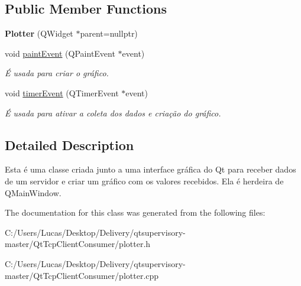 \subsection*{Public Member Functions}
\begin{DoxyCompactItemize}
\item 
\mbox{\label{class_plotter_a1807627530de30ae58dff3c42a823497}} 
{\bfseries Plotter} (Q\+Widget $\ast$parent=nullptr)
\item 
\mbox{\label{class_plotter_a06477bf987646f000a8982db1352a11d}} 
void \mbox{\hyperlink{class_plotter_a06477bf987646f000a8982db1352a11d}{paint\+Event}} (Q\+Paint\+Event $\ast$event)
\begin{DoxyCompactList}\small\item\em É usada para criar o gráfico. \end{DoxyCompactList}\item 
\mbox{\label{class_plotter_a63aa82ff02f2ff644403dfa4575c439b}} 
void \mbox{\hyperlink{class_plotter_a63aa82ff02f2ff644403dfa4575c439b}{timer\+Event}} (Q\+Timer\+Event $\ast$event)
\begin{DoxyCompactList}\small\item\em É usada para ativar a coleta dos dados e criação do gráfico. \end{DoxyCompactList}\end{DoxyCompactItemize}


\subsection{Detailed Description}
Esta é uma classe criada junto a uma interface gráfica do Qt para receber dados de um servidor e criar um gráfico com os valores recebidos. Ela é herdeira de Q\+Main\+Window. 

The documentation for this class was generated from the following files\+:\begin{DoxyCompactItemize}
\item 
C\+:/\+Users/\+Lucas/\+Desktop/\+Delivery/qtsupervisory-\/master/\+Qt\+Tcp\+Client\+Consumer/plotter.\+h\item 
C\+:/\+Users/\+Lucas/\+Desktop/\+Delivery/qtsupervisory-\/master/\+Qt\+Tcp\+Client\+Consumer/plotter.\+cpp\end{DoxyCompactItemize}

